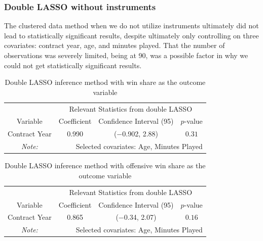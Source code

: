 \documentclass[12pt]{article}
\begin{document}
	\subsubsection{Double LASSO without instruments}
	
	The clustered data method when we do not utilize instruments ultimately did not lead to statistically significant results, despite ultimately only controlling on three covariates: contract year, age, and minutes played. That the number of observations was severely limited, being at 90, was a possible factor in why we could not get statistically significant results.
	
	\begin{table}[!htbp]
		\centering
		\caption{Double LASSO inference method with win share as the outcome variable}
		\label{lassows} 
		\begin{tabular}{*4c}
			\toprule
			& \multicolumn{3}{c}{Relevant Statistics from double LASSO} \\
			\cmidrule(lr){2-4}
			Variable & Coefficient  & Confidence Interval (95) & $p$-value \\
			\midrule
			Contract Year & 0.990       & ($-$0.902, 2.88) & $0.31$       \\
			\bottomrule
			\textit{Note:}  & \multicolumn{3}{r}{Selected covariates: Age, Minutes Played} \\ 
		\end{tabular}
	\end{table}
	
	\begin{table}[!htbp]
		\centering
		\caption{Double LASSO inference method with offensive win share as the outcome variable}
		\label{lassoows} 
		\begin{tabular}{*4c}
			\toprule
			& \multicolumn{3}{c}{Relevant Statistics from double LASSO} \\
			\cmidrule(lr){2-4}
			Variable & Coefficient  & Confidence Interval (95) & $p$-value \\
			\midrule
			Contract Year & 0.865       & ($-$0.34, 2.07) & $0.16$       \\
			\bottomrule
			\textit{Note:}  & \multicolumn{3}{r}{Selected covariates: Age, Minutes Played} \\
		\end{tabular}
	\end{table}
	
\end{document}
